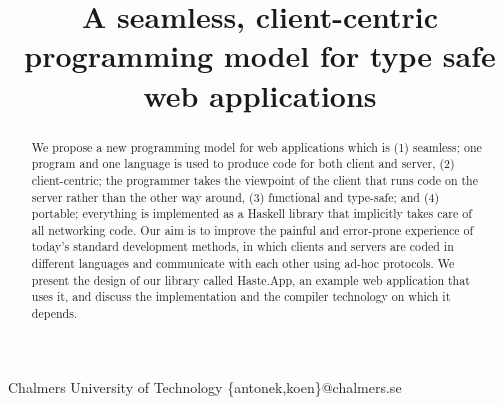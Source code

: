 \documentclass[preprint]{sigplanconf}
\begin{document}
\setlength{\pdfpageheight}{\paperheight}
\setlength{\pdfpagewidth}{\paperwidth}






\title{A seamless, client-centric programming model for type safe web applications}

           {Chalmers University of Technology}
           {\{antonek,koen\}@chalmers.se}

\maketitle

\begin{abstract}
We propose a new programming model for web applications which is (1)
seamless; one program and one language is used to produce code for
both client and server, (2) client-centric; the programmer takes the
viewpoint of the client that runs code on the server rather than the
other way around, (3) functional and type-safe; and (4) portable;
everything is implemented as a Haskell library that implicitly takes
care of all networking code. Our aim is to improve the painful and
error-prone experience of today's standard development methods,
in which clients and servers are coded in different languages and
communicate with each other using ad-hoc protocols.
We present the design of our library called Haste.App,
an example web application that uses it, and discuss
the implementation and the compiler technology on which it depends.
\end{abstract}
\end{document}
